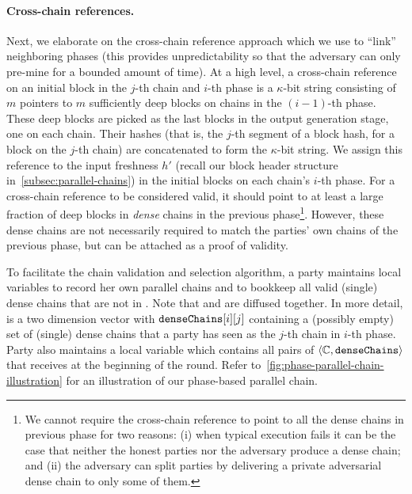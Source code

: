 \paragraph{Cross-chain references.}
%
Next, we elaborate on the cross-chain reference approach which we use to ``link'' neighboring phases (this provides unpredictability so that the adversary can only pre-mine for a bounded amount of time).
%
At a high level, a cross-chain reference on an initial block in the $j$-th chain and $i$-th phase is a $\kappa$-bit string consisting of $m$ pointers to $m$ sufficiently deep blocks on chains in the $(i - 1)$-th phase.
%
These deep blocks are picked as the last blocks in the output generation stage, one on each chain.
%
Their hashes (that is, the $j$-th segment of a block hash, for a block on the $j$-th chain) are concatenated to form the $\kappa$-bit string.
%
We assign this reference to the input freshness $h'$ (recall our block header structure in~\cref{subsec:parallel-chains}) in the initial blocks on each chain's $i$-th phase.
%
For a cross-chain reference to be considered valid, it should point to at least a large fraction of deep blocks in \emph{dense} chains in the previous phase\footnote{We cannot require the cross-chain reference to point to all the dense chains in previous phase for two reasons: (i) when typical execution fails it can be the case that neither the honest parties nor the adversary produce a dense chain; and (ii) the adversary can split parties by delivering a private adversarial dense chain to only some of them.}.
%
However, these dense chains are not necessarily required to match the parties' own chains of the previous phase, but can be attached as a proof of validity.

To facilitate the chain validation and selection algorithm, a party \party maintains local variables \parallelChainsLocal to record her own parallel chains and \denseChains to bookkeep all valid (single) dense chains that are not in \parallelChainsLocal.
%
Note that \denseChains and \parallelChainsLocal are diffused together.
%
In more detail, \denseChains is a two dimension vector with $\mathtt{denseChains}[i][j]$ containing a (possibly empty) set of (single) dense chains that a party has seen as the $j$-th chain in $i$-th phase.
%
Party \party also maintains a local variable \chainBuffer which contains all pairs of $\langle \mathbb{C}, \mathtt{denseChains} \rangle$ that \party receives at the beginning of the round.
%
Refer to~\cref{fig:phase-parallel-chain-illustration} for an illustration of our phase-based parallel chain.

